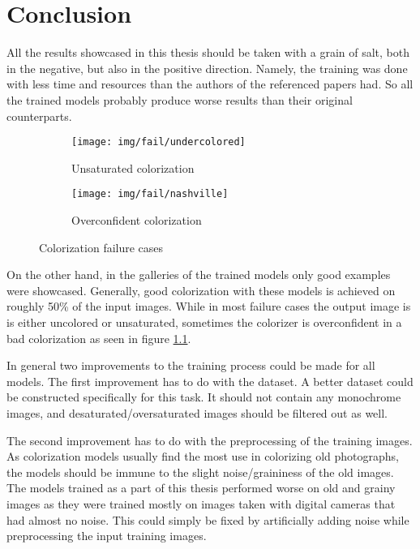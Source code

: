 \chapter{Conclusion}

All the results showcased in this thesis should be taken with a grain of salt, 
both in the negative, but also in the positive direction. Namely, the training was 
done with less time and resources than the authors of the referenced papers had.
So all the trained models probably produce worse results than their original counterparts.

\begin{figure}[!ht]
	\centering
	\begin{subfigure}{.4\textwidth}
		\centering
		\texttt{[image: img/fail/undercolored]}
        \caption{Unsaturated colorization}
	\end{subfigure}
    \begin{subfigure}{.4\textwidth}
		\centering
		\texttt{[image: img/fail/nashville]}
        \caption{Overconfident colorization}
    \end{subfigure}
    \caption{Colorization failure cases}
    \label{fig:fail}
\end{figure}

On the other hand, in the galleries of the trained models only good examples were 
showcased. Generally, good colorization with these models is achieved on roughly 50\%
of the input images. While in most failure cases the output image is is either uncolored 
or unsaturated, sometimes the colorizer is overconfident in a bad colorization as seen 
in figure \ref{fig:fail}.

In general two improvements to the training process could be made for all models.
The first improvement has to do with the dataset. A better dataset could be 
constructed specifically for this task. It should not contain any monochrome images, 
and desaturated/oversaturated images should be filtered out as well. 

The second improvement has to do with the preprocessing of the training images. 
As colorization models usually find the most use in colorizing old photographs, 
the models should be immune to the slight noise/graininess of the old images. 
The models trained as a part of this thesis performed worse on old and grainy images
as they were trained mostly on images taken with digital cameras that had almost no 
noise. This could simply be fixed by artificially adding noise while preprocessing
the input training images.

